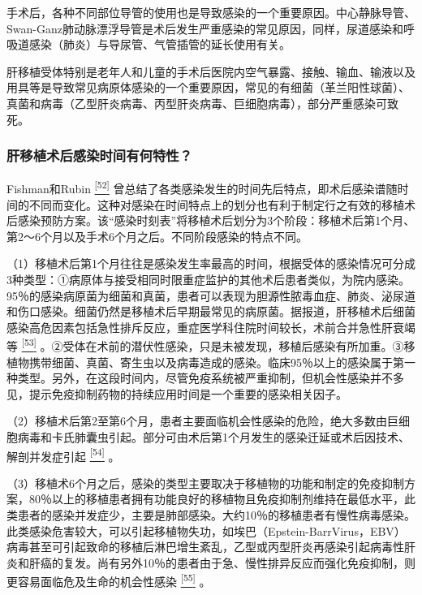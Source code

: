 手术后，各种不同部位导管的使用也是导致感染的一个重要原因。中心静脉导管、Swan-Ganz肺动脉漂浮导管是术后发生严重感染的常见原因，同样，尿道感染和呼吸道感染（肺炎）与导尿管、气管插管的延长使用有关。

肝移植受体特别是老年人和儿童的手术后医院内空气暴露、接触、输血、输液以及用具等是导致常见病原体感染的一个重要原因，常见的有细菌（革兰阳性球菌）、真菌和病毒（乙型肝炎病毒、丙型肝炎病毒、巨细胞病毒），部分严重感染可致死。

\subsubsection{肝移植术后感染时间有何特性？}

Fishman和Rubin
\protect\hyperlink{text00020.htmlux5cux23ch52-19}{\textsuperscript{{[}52{]}}}
曾总结了各类感染发生的时间先后特点，即术后感染谱随时间的不同而变化。这种对感染在时间特点上的划分也有利于制定行之有效的移植术后感染预防方案。该“感染时刻表”将移植术后划分为3个阶段：移植术后第1个月、第2～6个月以及手术6个月之后。不同阶段感染的特点不同。

（1）移植术后第1个月往往是感染发生率最高的时间，根据受体的感染情况可分成3种类型：①病原体与接受相同时限重症监护的其他术后患者类似，为院内感染。95％的感染病原菌为细菌和真菌，患者可以表现为胆源性脓毒血症、肺炎、泌尿道和伤口感染。细菌仍然是移植术后早期最常见的病原菌。据报道，肝移植术后细菌感染高危因素包括急性排斥反应，重症医学科住院时间较长，术前合并急性肝衰竭等
\protect\hyperlink{text00020.htmlux5cux23ch53-19}{\textsuperscript{{[}53{]}}}
。②受体在术前的潜伏性感染，只是未被发现，移植后感染有所加重。③移植物携带细菌、真菌、寄生虫以及病毒造成的感染。临床95％以上的感染属于第一种类型。另外，在这段时间内，尽管免疫系统被严重抑制，但机会性感染并不多见，提示免疫抑制药物的持续应用时间是一个重要的感染相关因子。

（2）移植术后第2至第6个月，患者主要面临机会性感染的危险，绝大多数由巨细胞病毒和卡氏肺囊虫引起。部分可由术后第1个月发生的感染迁延或术后因技术、解剖并发症引起
\protect\hyperlink{text00020.htmlux5cux23ch54-19}{\textsuperscript{{[}54{]}}}
。

（3）移植术6个月之后，感染的类型主要取决于移植物的功能和制定的免疫抑制方案，80％以上的移植患者拥有功能良好的移植物且免疫抑制剂维持在最低水平，此类患者的感染并发症少，主要是肺部感染。大约10％的移植患者有慢性病毒感染。此类感染危害较大，可以引起移植物失功，如埃巴（Epstein-BarrVirus，EBV）病毒甚至可引起致命的移植后淋巴增生紊乱，乙型或丙型肝炎再感染引起病毒性肝炎和肝癌的复发。尚有另外10％的患者由于急、慢性排异反应而强化免疫抑制，则更容易面临危及生命的机会性感染
\protect\hyperlink{text00020.htmlux5cux23ch55-19}{\textsuperscript{{[}55{]}}}
。

